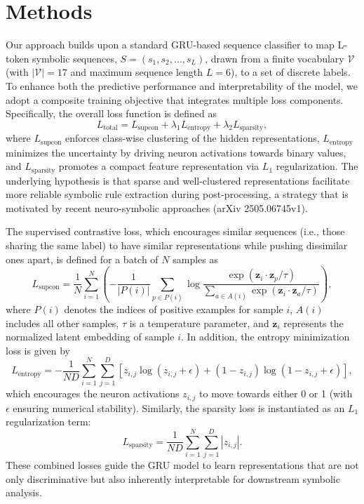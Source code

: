 \documentclass[12pt]{article}
\begin{document}
\section{Methods}
Our approach builds upon a standard GRU-based sequence classifier to map L-token symbolic sequences, \( S = (s_1, s_2, \dots, s_L) \), drawn from a finite vocabulary \(\mathcal{V}\) (with \(|\mathcal{V}| = 17\) and maximum sequence length \(L = 6\)), to a set of discrete labels. To enhance both the predictive performance and interpretability of the model, we adopt a composite training objective that integrates multiple loss components. Specifically, the overall loss function is defined as
\[
L_{\text{total}} = L_{\text{supcon}} + \lambda_1 L_{\text{entropy}} + \lambda_2 L_{\text{sparsity}},
\]
where \(L_{\text{supcon}}\) enforces class-wise clustering of the hidden representations, \(L_{\text{entropy}}\) minimizes the uncertainty by driving neuron activations towards binary values, and \(L_{\text{sparsity}}\) promotes a compact feature representation via \(L_1\) regularization. The underlying hypothesis is that sparse and well-clustered representations facilitate more reliable symbolic rule extraction during post-processing, a strategy that is motivated by recent neuro-symbolic approaches (arXiv 2505.06745v1).

The supervised contrastive loss, which encourages similar sequences (i.e., those sharing the same label) to have similar representations while pushing dissimilar ones apart, is defined for a batch of \(N\) samples as
\[
L_{\text{supcon}} = \frac{1}{N} \sum_{i=1}^N \left( -\frac{1}{|P(i)|} \sum_{p \in P(i)} \log \frac{\exp\left(\mathbf{z}_i \cdot \mathbf{z}_p/\tau\right)}{\sum_{a \in A(i)} \exp\left(\mathbf{z}_i \cdot \mathbf{z}_a/\tau\right)} \right),
\]
where \(P(i)\) denotes the indices of positive examples for sample \(i\), \(A(i)\) includes all other samples, \(\tau\) is a temperature parameter, and \(\mathbf{z}_i\) represents the normalized latent embedding of sample \(i\). In addition, the entropy minimization loss is given by
\[
L_{\text{entropy}} = -\frac{1}{ND} \sum_{i=1}^{N} \sum_{j=1}^{D} \left[ z_{i,j}\log(z_{i,j}+\epsilon) + (1-z_{i,j})\log(1-z_{i,j}+\epsilon) \right],
\]
which encourages the neuron activations \(z_{i,j}\) to move towards either 0 or 1 (with \(\epsilon\) ensuring numerical stability). Similarly, the sparsity loss is instantiated as an \(L_1\) regularization term:
\[
L_{\text{sparsity}} = \frac{1}{ND} \sum_{i=1}^{N} \sum_{j=1}^{D} |z_{i,j}|.
\]
These combined losses guide the GRU model to learn representations that are not only discriminative but also inherently interpretable for downstream symbolic analysis.
\end{document}
